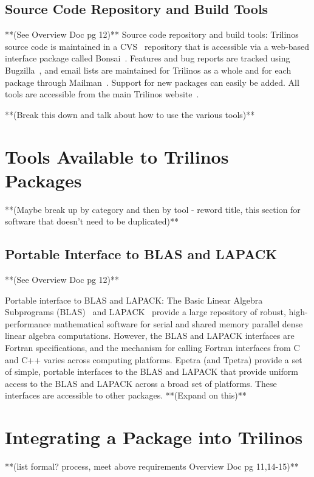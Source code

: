 \documentclass[12pt,relax]{TrilinosDevGuide}
\begin{document}
	
	\section{Source Code Repository and Build Tools}
	**(See Overview Doc pg 12)**
Source code repository and build tools: Trilinos source code is
maintained in a CVS~\cite{CVS} repository that is accessible via a
web-based interface package called Bonsai~\cite{Bonsai}.  Features and bug 
reports are tracked using Bugzilla~\cite{Bugzilla}, and email lists are
maintained for Trilinos as a whole and for each package through 
Mailman~\cite{Mailman}.  Support for new packages can easily be added.  All 
tools are accessible from the main Trilinos website~\cite{Trilinos-home-page}.


**(Break this down and talk about how to use the various tools)**

	\chapter{Tools Available to Trilinos Packages}
	**(Maybe break up by category and then by tool - reword title, this section for software that doesn't need to be duplicated)**
	\section{Portable Interface to BLAS and LAPACK}
	**(See Overview Doc pg 12)**

Portable interface to BLAS and LAPACK: The Basic Linear Algebra
Subprograms (BLAS)~\cite{BLAS1,BLAS2,BLAS3} and LAPACK~\cite{lapack}
provide a large repository of robust, high-performance mathematical
software for serial and shared memory parallel dense linear algebra
computations.  However, the BLAS and LAPACK interfaces are Fortran
specifications, and the mechanism for calling Fortran interfaces from
C and C++ varies across computing platforms.  Epetra (and Tpetra)
provide a set of simple, portable interfaces to the BLAS and LAPACK
that provide uniform access to the BLAS and LAPACK across a broad
set of platforms.  These interfaces are accessible to
other packages.
**(Expand on this)**


	\chapter{Integrating a Package into Trilinos}
	**(list formal? process, meet above requirements Overview Doc pg 11,14-15)**
\end{document}
